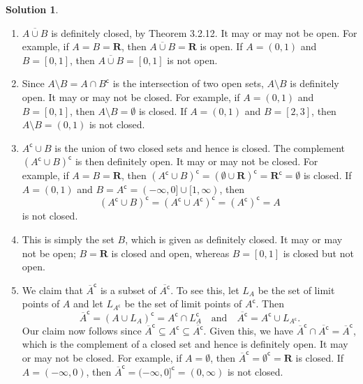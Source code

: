\documentclass[12pt]{article}
\theoremstyle{definition}
\theoremstyle{exercise}
\theoremstyle{solution}
\newtheorem*{solution}{Solution}
\newcommand{\setcomp}[1]{#1^{\mathsf{c}}}
\newcommand{\quand}{\quad \text{and} \quad}
\newcommand{\R}{\mathbf{R}}
\begin{document}
\begin{solution}
    \begin{enumerate}
        \item \( \overline{A \cup B} \) is definitely closed, by Theorem 3.2.12. It may or may not be open. For example, if \( A = B = \R \), then \( \overline{A \cup B} = \R \) is open. If \( A = (0, 1) \) and \( B = [0, 1] \), then \( \overline{A \cup B} = [0, 1] \) is not open.

        \item Since \( A \setminus B = A \cap \setcomp{B} \) is the intersection of two open sets, \( A \setminus B \) is definitely open. It may or may not be closed. For example, if \( A = (0, 1) \) and \( B = [0, 1] \), then \( A \setminus B = \emptyset \) is closed. If \( A = (0, 1) \) and \( B = [2, 3] \), then \( A \setminus B = (0, 1) \) is not closed.

        \item \( \setcomp{A} \cup B \) is the union of two closed sets and hence is closed. The complement \( \setcomp{(\setcomp{A} \cup B)} \) is then definitely open. It may or may not be closed. For example, if \( A = B = \R \), then \( \setcomp{(\setcomp{A} \cup B)} = \setcomp{(\emptyset \cup \R)} = \setcomp{\R} = \emptyset \) is closed. If \( A = (0, 1) \) and \( B = \setcomp{A} = (-\infty, 0] \cup [1, \infty) \), then
        \[
            \setcomp{(\setcomp{A} \cup B)} = \setcomp{(\setcomp{A} \cup \setcomp{A})} = \setcomp{(\setcomp{A})} = A
        \]
        is not closed.

        \item This is simply the set \( B \), which is given as definitely closed. It may or may not be open; \( B = \R \) is closed and open, whereas \( B = [0, 1] \) is closed but not open.

        \item We claim that \( \setcomp{\overline{A}} \) is a subset of \( \overline{\setcomp{A}} \). To see this, let \( L_A \) be the set of limit points of \( A \) and let \( L_{\setcomp{A}} \) be the set of limit points of \( \setcomp{A} \). Then
        \[
            \setcomp{\overline{A}} = \setcomp{(A \cup L_A)} = \setcomp{A} \cap \setcomp{L_A} \quand \overline{\setcomp{A}} = \setcomp{A} \cup L_{\setcomp{A}}.
        \]
        Our claim now follows since \( \setcomp{\overline{A}} \subseteq \setcomp{A} \subseteq \overline{\setcomp{A}} \). Given this, we have \( \setcomp{\overline{A}} \cap \overline{\setcomp{A}} = \setcomp{\overline{A}} \), which is the complement of a closed set and hence is definitely open. It may or may not be closed. For example, if \( A = \emptyset \), then \( \setcomp{\overline{A}} = \setcomp{\emptyset} = \R \) is closed. If \( A = (-\infty, 0) \), then \( \setcomp{\overline{A}} = \setcomp{(-\infty, 0]} = (0, \infty) \) is not closed.
    \end{enumerate}
\end{solution}
\end{document}
